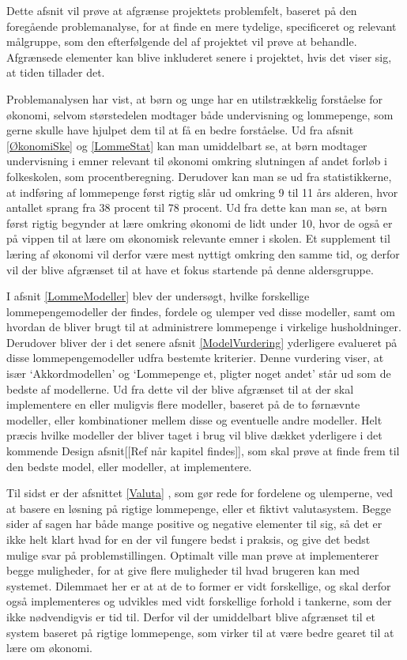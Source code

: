 Dette afsnit vil prøve at afgrænse projektets problemfelt, baseret på den foregående problemanalyse, for at finde en mere tydelige, specificeret og relevant målgruppe, som den efterfølgende del af projektet vil prøve at behandle. Afgrænsede elementer kan blive inkluderet senere i projektet, hvis det viser sig, at tiden tillader det.

Problemanalysen har vist, at børn og unge har en utilstrækkelig forståelse for økonomi, selvom størstedelen modtager både undervisning og lommepenge, som gerne skulle have hjulpet dem til at få en bedre forståelse. Ud fra afsnit \ref{ØkonomiSke}  og \ref{LommeStat}  kan man umiddelbart se, at børn modtager undervisning i emner relevant til økonomi omkring slutningen af andet forløb i folkeskolen, som procentberegning. Derudover kan man se ud fra statistikkerne, at indføring af lommepenge først rigtig slår ud omkring 9 til 11 års alderen, hvor antallet sprang fra 38 procent til 78 procent. Ud fra dette kan man se, at børn først rigtig begynder at lære omkring økonomi de lidt under 10, hvor de også er på vippen til at lære om økonomisk relevante emner i skolen. Et supplement til læring af økonomi vil derfor være mest nyttigt omkring den samme tid, og derfor vil der blive afgrænset til at have et fokus startende på denne aldersgruppe.

I afsnit \ref{LommeModeller}  blev der undersøgt, hvilke forskellige lommepengemodeller der findes, fordele og ulemper ved disse modeller, samt om hvordan de bliver brugt til at administrere lommepenge i virkelige husholdninger. Derudover bliver der i det senere afsnit \ref{ModelVurdering}  yderligere evalueret på disse lommepengemodeller udfra bestemte kriterier. Denne vurdering viser, at især ‘Akkordmodellen’ og ‘Lommepenge et, pligter noget andet’ står ud som de bedste af modellerne. Ud fra dette vil der blive afgrænset til at der skal implementere en eller muligvis flere modeller, baseret på de to førnævnte modeller, eller kombinationer mellem disse og eventuelle andre modeller. Helt præcis hvilke modeller der bliver taget i brug vil blive dækket yderligere i det kommende Design afsnit[[Ref når kapitel findes]], som skal prøve at finde frem til den bedste model, eller modeller, at implementere.

Til sidst er der afsnittet \ref{Valuta} , som gør rede for fordelene og ulemperne, ved at basere en løsning på rigtige lommepenge, eller et fiktivt valutasystem. Begge sider af sagen har både mange positive og negative elementer til sig, så det er ikke helt klart hvad for en der vil fungere bedst i praksis, og give det bedst mulige svar på problemstillingen. Optimalt ville man prøve at implementerer begge muligheder, for at give flere muligheder til hvad brugeren kan med systemet. Dilemmaet her er at at de to former er vidt forskellige, og skal derfor også implementeres og udvikles med vidt forskellige forhold i tankerne, som der ikke nødvendigvis er tid til. Derfor vil der umiddelbart blive afgrænset til et system baseret på rigtige lommepenge, som virker til at være bedre gearet til at lære om økonomi.